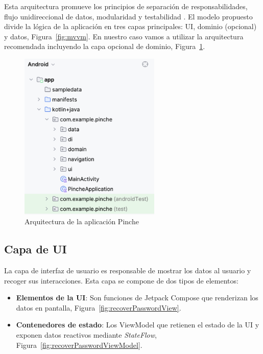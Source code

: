 Esta arquitectura promueve los principios de separación de responsabilidades, flujo unidireccional de datos, modularidad y testabilidad \cite{android-architecture}. El modelo propuesto divide la lógica de la aplicación en tres capas principales: UI, dominio (opcional) y datos, Figura~\ref{fig:mvvm}. En nuestro caso vamos a utilizar la arquitectura recomendada incluyendo la capa opcional de dominio, Figura~\ref{fig:pinche_architecture}.

\begin{figure}[H]
\centering
\includegraphics[width=0.6\textwidth]{./img/description/pinche_architecture.png}
\caption{Arquitectura de la aplicación Pinche}
\label{fig:pinche_architecture}
\end{figure}

\subsection{Capa de UI}

La capa de interfaz de usuario es responsable de mostrar los datos al usuario y recoger sus interacciones. Esta capa se compone de dos tipos de elementos:

\begin{itemize}
    \item \textbf{Elementos de la UI}: Son funciones de Jetpack Compose que renderizan los datos en pantalla, Figura~\ref{fig:recoverPasswordView}.
    \item \textbf{Contenedores de estado}: Los ViewModel que retienen el estado de la UI y exponen datos reactivos mediante \textit{StateFlow}, Figura~\ref{fig:recoverPasswordViewModel}.
\end{itemize}

